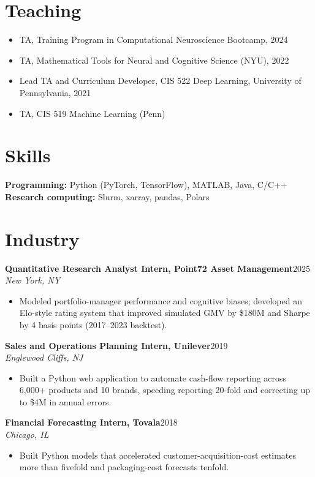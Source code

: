 \documentclass[10pt]{article}
\newcommand{\cvrole}[3]{%
  \textbf{#1}\hfill #3\\[-0.15em]
  \textit{#2}\par
}
\begin{document}
\section{Teaching}
\begin{itemize}
    \item TA, Training Program in Computational Neuroscience Bootcamp, 2024
    \item TA, Mathematical Tools for Neural and Cognitive Science (NYU), 2022
    \item Lead TA and Curriculum Developer, CIS 522 Deep Learning, University of Pennsylvania, 2021
    \item TA, CIS 519 Machine Learning (Penn)
\end{itemize}

\section{Skills}

\textbf{Programming:} Python (PyTorch, TensorFlow), MATLAB, Java, C/C++\\
\textbf{Research computing:} Slurm, xarray, pandas, Polars

\section{Industry}

\cvrole{Quantitative Research Analyst Intern, Point72 Asset Management}{New York, NY}{2025}
\begin{itemize}
    \item Modeled portfolio-manager performance and cognitive biases; developed an Elo-style rating system that improved simulated GMV by \$180M and Sharpe by 4 basis points (2017--2023 backtest).
\end{itemize}

\cvrole{Sales and Operations Planning Intern, Unilever}{Englewood Cliffs, NJ}{2019}
\begin{itemize}
    \item Built a Python web application to automate cash-flow reporting across 6,000+ products and 10 brands, speeding reporting 20-fold and correcting up to \$4M in annual errors.
\end{itemize}

\cvrole{Financial Forecasting Intern, Tovala}{Chicago, IL}{2018}
\begin{itemize}
    \item Built Python models that accelerated customer-acquisition-cost estimates more than fivefold and packaging-cost forecasts tenfold.
\end{itemize}
\end{document}
